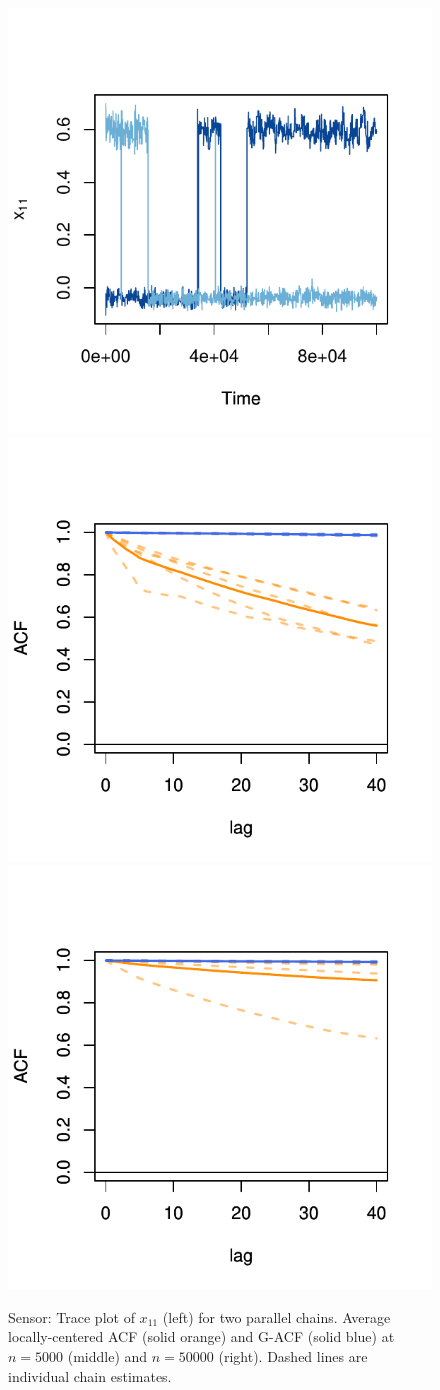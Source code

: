 \documentclass[12pt]{article}
\theoremstyle{remark}
\begin{document}
\begin{figure}[htbp]
    \centering
    \includegraphics[width = .32\textwidth]{plots/sensor-trace_loc1.pdf}
      \includegraphics[width = .32\textwidth]{plots/sensor-acf_n5e3.pdf}
      \includegraphics[width = .32\textwidth]{plots/sensor-acf_n5e4.pdf}    
    \caption{Sensor: Trace plot of $x_{11}$ (left) for two parallel chains. Average locally-centered ACF (solid orange) and G-ACF (solid blue) at $n = 5000$ (middle) and $n = 50000$ (right). Dashed lines are individual  chain estimates.}
    \label{fig:sensor-trace}
\end{figure}
\end{document}
